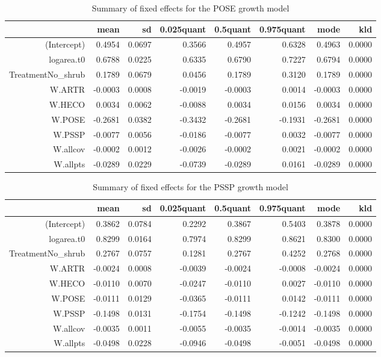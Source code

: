 \documentclass[11pt]{article}
\begin{document}
\begin{table}[ht]
\centering
\caption{Summary of fixed effects for the POSE growth model} 
\label{POSEgrowth}
\begin{tabular}{rrrrrrrr}
  \hline
 & mean & sd & 0.025quant & 0.5quant & 0.975quant & mode & kld \\ 
  \hline
(Intercept) & 0.4954 & 0.0697 & 0.3566 & 0.4957 & 0.6328 & 0.4963 & 0.0000 \\ 
  logarea.t0 & 0.6788 & 0.0225 & 0.6335 & 0.6790 & 0.7227 & 0.6794 & 0.0000 \\ 
  TreatmentNo\_shrub & 0.1789 & 0.0679 & 0.0456 & 0.1789 & 0.3120 & 0.1789 & 0.0000 \\ 
  W.ARTR & -0.0003 & 0.0008 & -0.0019 & -0.0003 & 0.0014 & -0.0003 & 0.0000 \\ 
  W.HECO & 0.0034 & 0.0062 & -0.0088 & 0.0034 & 0.0156 & 0.0034 & 0.0000 \\ 
  W.POSE & -0.2681 & 0.0382 & -0.3432 & -0.2681 & -0.1931 & -0.2681 & 0.0000 \\ 
  W.PSSP & -0.0077 & 0.0056 & -0.0186 & -0.0077 & 0.0032 & -0.0077 & 0.0000 \\ 
  W.allcov & -0.0002 & 0.0012 & -0.0026 & -0.0002 & 0.0021 & -0.0002 & 0.0000 \\ 
  W.allpts & -0.0289 & 0.0229 & -0.0739 & -0.0289 & 0.0161 & -0.0289 & 0.0000 \\ 
   \hline
\end{tabular}
\end{table}


\begin{table}[ht]
\centering
\caption{Summary of fixed effects for the PSSP growth model} 
\label{PSSPgrowth}
\begin{tabular}{rrrrrrrr}
  \hline
 & mean & sd & 0.025quant & 0.5quant & 0.975quant & mode & kld \\ 
  \hline
(Intercept) & 0.3862 & 0.0784 & 0.2292 & 0.3867 & 0.5403 & 0.3878 & 0.0000 \\ 
  logarea.t0 & 0.8299 & 0.0164 & 0.7974 & 0.8299 & 0.8621 & 0.8300 & 0.0000 \\ 
  TreatmentNo\_shrub & 0.2767 & 0.0757 & 0.1281 & 0.2767 & 0.4252 & 0.2768 & 0.0000 \\ 
  W.ARTR & -0.0024 & 0.0008 & -0.0039 & -0.0024 & -0.0008 & -0.0024 & 0.0000 \\ 
  W.HECO & -0.0110 & 0.0070 & -0.0247 & -0.0110 & 0.0027 & -0.0110 & 0.0000 \\ 
  W.POSE & -0.0111 & 0.0129 & -0.0365 & -0.0111 & 0.0142 & -0.0111 & 0.0000 \\ 
  W.PSSP & -0.1498 & 0.0131 & -0.1754 & -0.1498 & -0.1242 & -0.1498 & 0.0000 \\ 
  W.allcov & -0.0035 & 0.0011 & -0.0055 & -0.0035 & -0.0014 & -0.0035 & 0.0000 \\ 
  W.allpts & -0.0498 & 0.0228 & -0.0946 & -0.0498 & -0.0051 & -0.0498 & 0.0000 \\ 
   \hline
\end{tabular}
\end{table}
\end{document}
